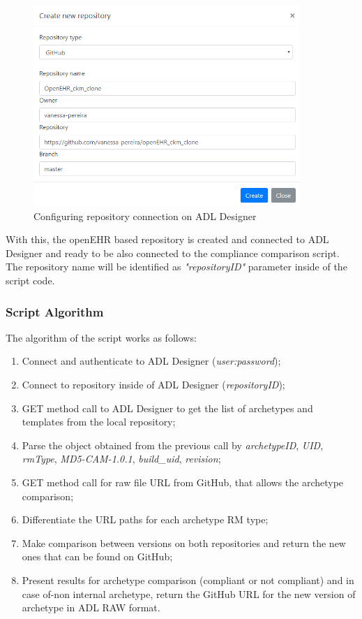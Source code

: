 \documentclass[mim_thesis.tex]{subfiles}
\begin{document}
\begin{figure}[H]
	\centering
    \includegraphics[width=0.9\textwidth]{img/adl_designer_repositories.PNG}
	\caption{Configuring repository connection on ADL Designer}
	\label{fig:adl_designer_repositories}
\end{figure}

With this, the openEHR based repository is created and connected to ADL Designer and ready to be also connected to the compliance comparison script. The repository name will be identified as \textit{"repositoryID"} parameter inside of the script code.

\subsubsection{Script Algorithm}
The algorithm of the script works as follows:
\begin{enumerate}[noitemsep]
\item Connect and authenticate to ADL Designer (\textit{user:password});
\item Connect to repository inside of ADL Designer (\textit{repositoryID});
\item GET method call to ADL Designer to get the list of archetypes and templates from the local repository;
\item Parse the object obtained from the previous call by \textit{archetypeID}, \textit{UID}, \textit{rmType}, \textit{MD5-CAM-1.0.1}, \textit{build\_uid}, \textit{revision};
\item GET method call for raw file URL from GitHub, that allows the archetype comparison;
\item Differentiate the URL paths for each archetype RM type;
\item Make comparison between versions on both repositories and return the new ones that can be found on GitHub;
\item Present results for archetype comparison (compliant or not compliant) and in case of-non internal archetype, return the GitHub URL for the new version of archetype in ADL RAW format.
\end{enumerate}
 
\end{document}
